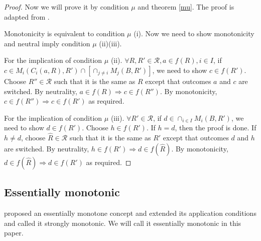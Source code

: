 \begin{proof}

  Now we will prove it by condition $\mu$ and theorem \ref{mu}. The proof is adapted from
  \parencite{Repullo90}.  

Monotonicity is equivalent to condition $\mu$ (i). Now we need to show
monotonicity and neutral imply
condition $\mu$ (ii)(iii).

For the implication of condition $\mu$ (ii). $\forall R, R' \in
\mathscr{R}, a \in f(R), i \in I$, if $c \in M_i(C_i(a, R), R') \cap [ \cap_{j
  \not = i} M_j(B, R')]$, we need to show $c \in f(R')$. Choose $R''
\in \mathscr{R}$ such that it is the same as $R$ except that outcomes
$a$ and $c$ are switched. By neutrality, $a \in f(R) \Rightarrow c \in
f(R'')$. By monotonicity, $c \in f(R'')  \Rightarrow c \in f(R')$ as
required.

For the implication of condition $\mu$ (iii). $\forall R' \in
\mathscr{R}$, if $ d \in \cap_{i \in I}M_i(B, R')$, we need to show $d
\in f(R')$. Choose $h \in f(R')$. If $h = d$, then the proof is done. 
If $h \not = d$, choose $\hat{R}
\in \mathscr{R}$ such that it is the same as $R'$ except that outcomes
$d$ and $h$ are switched. By neutrality, $h \in f(R') \Rightarrow d
\in f(\hat{R})$. By monotonicity, $d \in f(\hat{R}) \Rightarrow d \in
f(R')$ as required.
\end{proof}



\subsection{Essentially monotonic}
\parencite{Danilov1992}  proposed an essentially monotone concept
and \parencite{Yamato1992} extended its application conditions and
called it strongly monotonic. We will call it essentially  monotonic in this
paper. 

